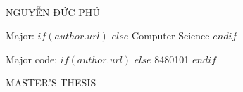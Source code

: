 \frontmatter %

\pagestyle{plain} %


\begin{titlepage}
\begin{center}
\setcounter{page}{0}
\vspace*{.06\textheight}
{\scshape \univname\par} %
\textbf{\deptname}\\[2cm] %

{\large NGUYỄN ĐỨC PHÚ} \\[3cm]


{\huge \bfseries \ttitle\par}\vspace{3cm} %

\begin{minipage}[t]{1.2\textwidth}
  \begin{flushleft} \large
    Major:
    $if(author.url)$
    \href{$author.url$}{\authorname} %
    $else$
    Computer Science
    $endif$
  \end{flushleft}
  \begin{flushleft} \large
    Major code:
    $if(author.url)$
    \href{$author.url$}{\authorname} %
    $else$
    8480101
    $endif$
  \end{flushleft}
\end{minipage}
\vspace{2cm}

\textsc{\Large MASTER'S THESIS}\\[0.5cm]
 

\end{center}
\end{titlepage}
